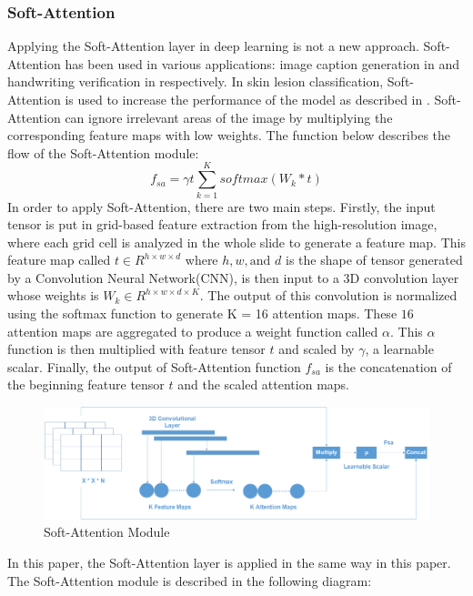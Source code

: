 \documentclass[sensors,article,submit,pdftex,moreauthors]{Definitions/mdpi}
\begin{document}
\subsubsection{Soft-Attention}
Applying the Soft-Attention layer in deep learning is not a new approach. Soft-Attention has been used in various applications: image caption generation in \cite{03044} and handwriting verification in \cite{202017} respectively. In skin lesion classification, Soft-Attention is used to increase the performance of the model as described in \cite{03358}. Soft-Attention can ignore irrelevant areas of the image by multiplying the corresponding feature maps with low weights. The function below describes the flow of the Soft-Attention module:
\[
f_{sa} = \gamma t\sum_{k=1}^{K}softmax(W_k * t)
\]
In order to apply Soft-Attention, there are two main steps. Firstly, the input tensor is put in grid-based feature extraction from the high-resolution image, where each grid cell is analyzed in the whole slide to generate a feature map\cite{08513}. This feature map called $t \in R^{h \times w \times d}$ where $h, w, \text{and } d$ is the shape of tensor generated by a Convolution Neural Network(CNN), is then input to a 3D convolution layer whose weights is $W_k \in R^{h \times w \times d \times K}$. The output of this convolution is normalized using the softmax function to generate K = 16 attention maps. These $16$ attention maps are aggregated to produce a weight function called $\alpha$. This $\alpha$ function is then multiplied with feature tensor $t$ and scaled by $\gamma$, a learnable scalar. Finally, the output of Soft-Attention function $f_{sa}$ is the concatenation of the beginning feature tensor $t$ and the scaled attention maps. 

\begin{figure}[H]
	\centering
	\includegraphics[width=1\linewidth]{Definitions/SoftAttention}
	\caption{Soft-Attention Module}
	\label{fig:soft-attention}
\end{figure}

In this paper, the Soft-Attention layer is applied in the same way in this paper\cite{03358}. The Soft-Attention module is described in the following diagram:
\end{document}
